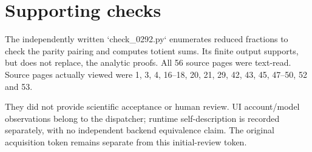 \documentclass[10pt]{article}
\begin{document}
\section*{Supporting checks}
The independently written `check\_0292.py` enumerates reduced fractions to check the parity pairing and computes totient sums. Its finite output supports, but does not replace, the analytic proofs. All 56 source pages were text-read. Source pages actually viewed were 1, 3, 4, 16–18, 20, 21, 29, 42, 43, 45, 47–50, 52 and 53.\par
They did not provide scientific acceptance or human review. UI account/model observations belong to the dispatcher; runtime self-description is recorded separately, with no independent backend equivalence claim. The original acquisition token remains separate from this initial-review token.\par
\end{document}
